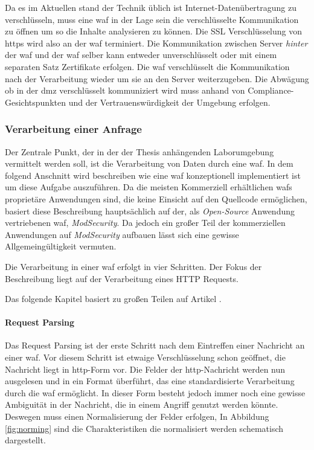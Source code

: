 Da es im Aktuellen stand der Technik üblich ist Internet-Datenübertragung zu verschlüsseln, muss eine \ac{waf} in der Lage sein die verschlüsselte Kommunikation zu öffnen um so die Inhalte analysieren zu können. %
Die SSL Verschlüsselung von \ac{https} wird also an der \ac{waf} terminiert.
Die Kommunikation zwischen Server \textit{hinter} der \ac{waf} und der \ac{waf} selber kann entweder unverschlüsselt oder mit einem separaten Satz Zertifikate erfolgen.
Die \ac{waf} verschlüsselt die Kommunikation nach der Verarbeitung wieder um sie an den Server weiterzugeben.
Die Abwägung ob in der \ac{dmz} verschlüsselt kommuniziert wird muss anhand von Compliance-Gesichtspunkten und der Vertrauenswürdigkeit der Umgebung erfolgen\cite{guptaWEBAPPLICATIONFIREWALL2007}.%

\subsubsection{Verarbeitung einer Anfrage}
Der Zentrale Punkt, der in der der Thesis anhängenden Laborumgebung vermittelt werden soll, ist die Verarbeitung von Daten durch eine \ac{waf}.
In dem folgend Anschnitt wird beschreiben wie eine \ac{waf} konzeptionell implementiert ist um diese Aufgabe auszuführen.
Da die meisten Kommerziell erhältlichen \acp{waf} proprietäre Anwendungen sind, die keine Einsicht auf den Quellcode ermöglichen, basiert diese Beschreibung hauptsächlich auf der, als \textit{Open-Source} Anwendung vertriebenen \ac{waf}, \textit{ModSecurity}.
Da jedoch ein großer Teil der kommerziellen Anwendungen auf \textit{ModSecurity} aufbauen lässt sich eine gewisse Allgemeingültigkeit vermuten.

Die Verarbeitung in einer \ac{waf} erfolgt in vier Schritten. Der Fokus der Beschreibung liegt auf der Verarbeitung eines HTTP Requests.

Das folgende Kapitel basiert zu großen Teilen auf Artikel \cite{yuanResearchImplementationWEB2019}.

\paragraph{Request Parsing}
Das Request Parsing ist der erste Schritt nach dem Eintreffen einer Nachricht an einer \ac{waf}.
Vor diesem Schritt ist etwaige Verschlüsselung schon geöffnet, die Nachricht liegt in \ac{http}-Form vor.
Die Felder der \ac{http}-Nachricht werden nun ausgelesen und in ein Format überführt, das eine standardisierte Verarbeitung durch die \ac{waf} ermöglicht.
In dieser Form besteht jedoch immer noch eine gewisse Ambiguität in der Nachricht, die in einem Angriff genutzt werden könnte.
Deswegen muss einen Normalisierung der Felder erfolgen,
In Abbildung \ref{fig:norming} sind die Charakteristiken die normalisiert werden schematisch dargestellt.

